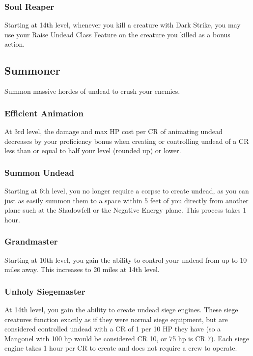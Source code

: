 \subsubsection{Soul Reaper}
Starting at 14th level, whenever you kill a creature with Dark Strike, you may use your Raise Undead Class Feature on the creature you killed as a bonus action.


\subsection{Summoner}
Summon massive hordes of undead to crush your enemies.

\subsubsection{Efficient Animation}
At 3rd level, the damage and max HP cost per CR of animating undead decreases by your proficiency bonus when creating or controlling undead of a CR less than or equal to half your level (rounded up) or lower.

\subsubsection{Summon Undead}
Starting at 6th level, you no longer require a corpse to create undead, as you can just as easily summon them to a space within 5 feet of you directly from another plane such at the Shadowfell or the Negative Energy plane. This process takes 1 hour.

\subsubsection{Grandmaster}
Starting at 10th level, you gain the ability to control your undead from up to 10 miles away. This increases to 20 miles at 14th level.

\subsubsection{Unholy Siegemaster}
At 14th level, you gain the ability to create undead siege engines. These siege creatures function exactly as if they were normal siege equipment, but are considered controlled undead with a CR of 1 per 10 HP they have (so a Mangonel with 100 hp would be considered CR 10, or 75 hp is CR 7). Each siege engine takes 1 hour per CR to create and does not require a crew to operate.

\newpage\cleardoublepage

